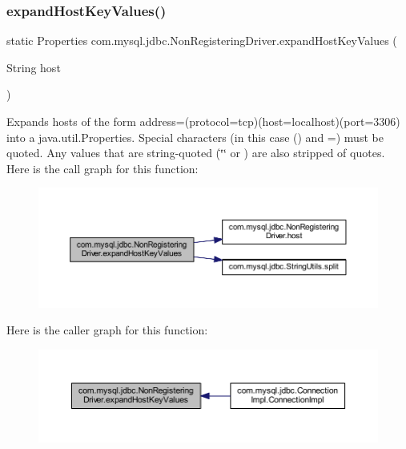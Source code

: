 \subsubsection{\texorpdfstring{expand\+Host\+Key\+Values()}{expandHostKeyValues()}}
{\footnotesize\ttfamily static Properties com.\+mysql.\+jdbc.\+Non\+Registering\+Driver.\+expand\+Host\+Key\+Values (\begin{DoxyParamCaption}\item[{String}]{host }\end{DoxyParamCaption})\hspace{0.3cm}{\ttfamily [static]}}

Expands hosts of the form address=(protocol=tcp)(host=localhost)(port=3306) into a java.\+util.\+Properties. Special characters (in this case () and =) must be quoted. Any values that are string-\/quoted (\char`\"{}\char`\"{} or \textquotesingle{}\textquotesingle{}) are also stripped of quotes. Here is the call graph for this function\+:
\nopagebreak
\begin{figure}[H]
\begin{center}
\leavevmode
\includegraphics[width=350pt]{classcom_1_1mysql_1_1jdbc_1_1_non_registering_driver_ab113b21e7be85905b13ac3f1ec511a09_cgraph}
\end{center}
\end{figure}
Here is the caller graph for this function\+:
\nopagebreak
\begin{figure}[H]
\begin{center}
\leavevmode
\includegraphics[width=350pt]{classcom_1_1mysql_1_1jdbc_1_1_non_registering_driver_ab113b21e7be85905b13ac3f1ec511a09_icgraph}
\end{center}
\end{figure}
\mbox{\label{classcom_1_1mysql_1_1jdbc_1_1_non_registering_driver_ab6b8f50a93d9ed238b561b75f33aac56}} 
